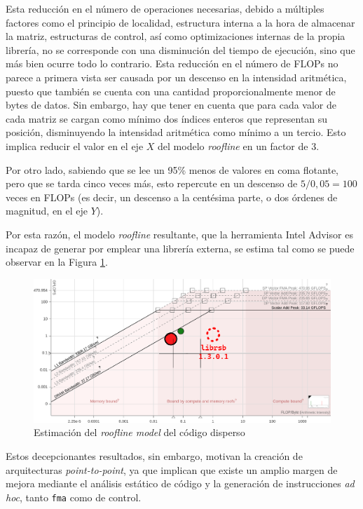 Esta reducción en el número de operaciones necesarias, debido a múltiples factores como el principio de localidad, estructura interna a la hora de almacenar la matriz, estructuras de control, así como optimizaciones internas de la propia librería, no se corresponde con una disminución del tiempo de ejecución, sino que más bien ocurre todo lo contrario. Esta reducción en el número de FLOPs no parece a primera vista ser causada por un descenso en la intensidad aritmética, puesto que también se cuenta con una cantidad proporcionalmente menor de bytes de datos. Sin embargo, hay que tener en cuenta que para cada valor de cada matriz se cargan como mínimo dos índices enteros que representan su posición, disminuyendo la intensidad aritmética como mínimo a un tercio. Esto implica reducir el valor en el eje $X$ del modelo \textit{roofline} en un factor de 3.

Por otro lado, sabiendo que se lee un 95\% menos de valores en coma flotante, pero que se tarda cinco veces más, esto repercute en un descenso de $5/0{,}05=100$ veces en FLOPs (es decir, un descenso a la centésima parte, o dos órdenes de magnitud, en el eje $Y$).

Por esta razón, el modelo \textit{roofline} resultante, que la herramienta Intel Advisor es incapaz de generar por emplear una librería externa, se estima tal como se puede observar en la Figura \ref{fig:roofline_sparse_estimado}.

\begin{figure}[h!]
    \centering
    \includegraphics[width=\textwidth]{img/rooflines/roofline_sparse_estimado.png}
    \caption{Estimación del \textit{roofline model} del código disperso}
    \label{fig:roofline_sparse_estimado}
\end{figure}

Estos decepcionantes resultados, sin embargo, motivan la creación de arquitecturas \textit{point-to-point}, ya que implican que existe un amplio margen de mejora mediante el análisis estático de código y la generación de instrucciones \textit{ad hoc}, tanto \texttt{\acrshort{fma}} como de control.


